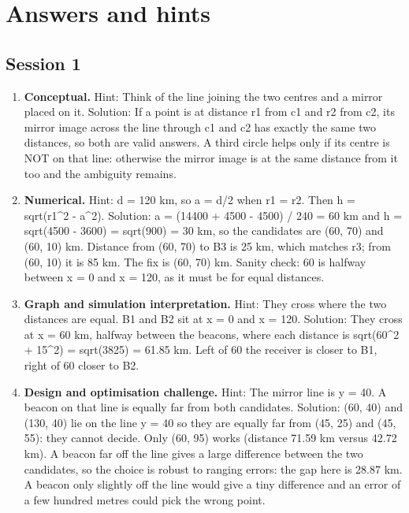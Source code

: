 \documentclass[11pt,a4paper]{article}
\begin{document}
\section{Answers and hints}

\subsection*{Session 1}
\begin{enumerate}[nosep]
\item \textbf{Conceptual.} Hint: Think of the line joining the two centres and a mirror placed on it. Solution: If a point is at distance r1 from c1 and r2 from c2, its mirror image across the line through c1 and c2 has exactly the same two distances, so both are valid answers. A third circle helps only if its centre is NOT on that line: otherwise the mirror image is at the same distance from it too and the ambiguity remains.
\item \textbf{Numerical.} Hint: d = 120 km, so a = d/2 when r1 = r2. Then h = sqrt(r1\textasciicircum{}2 - a\textasciicircum{}2). Solution: a = (14400 + 4500 - 4500) / 240 = 60 km and h = sqrt(4500 - 3600) = sqrt(900) = 30 km, so the candidates are (60, 70) and (60, 10) km. Distance from (60, 70) to B3 is 25 km, which matches r3; from (60, 10) it is 85 km. The fix is (60, 70) km. Sanity check: 60 is halfway between x = 0 and x = 120, as it must be for equal distances.
\item \textbf{Graph and simulation interpretation.} Hint: They cross where the two distances are equal. B1 and B2 sit at x = 0 and x = 120. Solution: They cross at x = 60 km, halfway between the beacons, where each distance is sqrt(60\textasciicircum{}2 + 15\textasciicircum{}2) = sqrt(3825) = 61.85 km. Left of 60 the receiver is closer to B1, right of 60 closer to B2.
\item \textbf{Design and optimisation challenge.} Hint: The mirror line is y = 40. A beacon on that line is equally far from both candidates. Solution: (60, 40) and (130, 40) lie on the line y = 40 so they are equally far from (45, 25) and (45, 55): they cannot decide. Only (60, 95) works (distance 71.59 km versus 42.72 km). A beacon far off the line gives a large difference between the two candidates, so the choice is robust to ranging errors: the gap here is 28.87 km. A beacon only slightly off the line would give a tiny difference and an error of a few hundred metres could pick the wrong point.
\end{enumerate}
\end{document}
